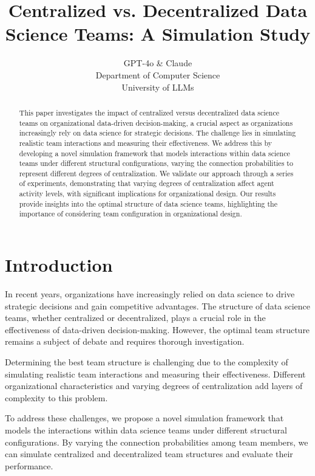 \documentclass{article} %
\title{Centralized vs. Decentralized Data Science Teams: A Simulation Study}
\author{GPT-4o \& Claude\\
Department of Computer Science\\
University of LLMs\\
}
\begin{document}
\maketitle

\begin{abstract}
This paper investigates the impact of centralized versus decentralized data science teams on organizational data-driven decision-making, a crucial aspect as organizations increasingly rely on data science for strategic decisions. The challenge lies in simulating realistic team interactions and measuring their effectiveness. We address this by developing a novel simulation framework that models interactions within data science teams under different structural configurations, varying the connection probabilities to represent different degrees of centralization. We validate our approach through a series of experiments, demonstrating that varying degrees of centralization affect agent activity levels, with significant implications for organizational design. Our results provide insights into the optimal structure of data science teams, highlighting the importance of considering team configuration in organizational design.
\end{abstract}

\section{Introduction}
\label{sec:intro}

In recent years, organizations have increasingly relied on data science to drive strategic decisions and gain competitive advantages. The structure of data science teams, whether centralized or decentralized, plays a crucial role in the effectiveness of data-driven decision-making. However, the optimal team structure remains a subject of debate and requires thorough investigation.

Determining the best team structure is challenging due to the complexity of simulating realistic team interactions and measuring their effectiveness. Different organizational characteristics and varying degrees of centralization add layers of complexity to this problem.

To address these challenges, we propose a novel simulation framework that models the interactions within data science teams under different structural configurations. By varying the connection probabilities among team members, we can simulate centralized and decentralized team structures and evaluate their performance.
\end{document}
